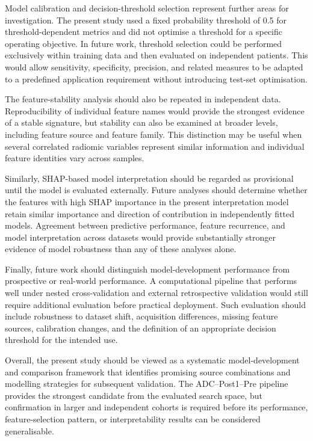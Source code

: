 \documentclass[12pt,twocolumn]{article}
\begin{document}
Model calibration and decision-threshold selection represent further
areas for investigation. The present study used a fixed probability
threshold of 0.5 for threshold-dependent metrics and did not optimise
a threshold for a specific operating objective. In future work,
threshold selection could be performed exclusively within training
data and then evaluated on independent patients. This would allow
sensitivity, specificity, precision, and related measures to be
adapted to a predefined application requirement without introducing
test-set optimisation.

The feature-stability analysis should also be repeated in independent
data. Reproducibility of individual feature names would provide the
strongest evidence of a stable signature, but stability can also be
examined at broader levels, including feature source and feature
family. This distinction may be useful when several correlated
radiomic variables represent similar information and individual
feature identities vary across samples.

Similarly, SHAP-based model interpretation should be regarded as
provisional until the model is evaluated externally. Future analyses
should determine whether the features with high SHAP importance in
the present interpretation model retain similar importance and
direction of contribution in independently fitted models. Agreement
between predictive performance, feature recurrence, and model
interpretation across datasets would provide substantially stronger
evidence of model robustness than any of these analyses alone.

Finally, future work should distinguish model-development performance
from prospective or real-world performance. A computational pipeline
that performs well under nested cross-validation and external
retrospective validation would still require additional evaluation
before practical deployment. Such evaluation should include
robustness to dataset shift, acquisition differences, missing feature
sources, calibration changes, and the definition of an appropriate
decision threshold for the intended use.

Overall, the present study should be viewed as a systematic
model-development and comparison framework that identifies promising
source combinations and modelling strategies for subsequent
validation. The ADC--Post1--Pre pipeline provides the strongest
candidate from the evaluated search space, but confirmation in larger
and independent cohorts is required before its performance,
feature-selection pattern, or interpretability results can be
considered generalisable.
\end{document}
